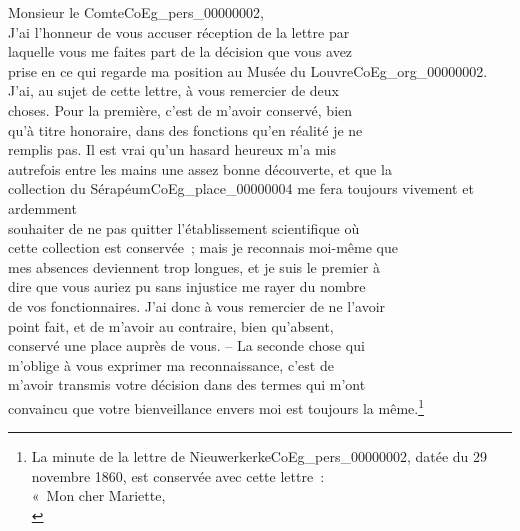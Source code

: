 \documentclass{book}
\begin{document}
{\hspace{1cm} Monsieur le Comte\gls{CoEg_pers_00000002},\\

\indent J’ai l’honneur de vous accuser réception de la lettre par\\
laquelle vous me faites part de la décision que vous avez\\
prise en ce qui regarde ma position au Musée du Louvre\gls{CoEg_org_00000002}.\\
\indent J’ai, au sujet de cette lettre, à vous remercier de deux\\
choses. Pour la première, c’est de m’avoir conservé, bien\\
qu’à titre honoraire, dans des fonctions qu’en réalité je ne\\
remplis pas. Il est vrai qu’un hasard heureux m’a mis\\
autrefois entre les mains une assez bonne découverte, et que la\\
collection du Sérapéum\gls{CoEg_place_00000004} me fera toujours vivement et ardemment\\
souhaiter de ne pas quitter l’établissement scientifique où\\
cette collection est conservée~; mais je reconnais moi-même que\\
mes absences deviennent trop longues, et je suis le premier à\\
dire que vous auriez pu sans injustice me rayer du nombre\\
de vos fonctionnaires. J’ai donc à vous remercier de ne l’avoir\\
point fait, et de m’avoir au contraire, bien qu’absent,\\
conservé une place auprès de vous. – La seconde chose qui\\
m’oblige à vous exprimer ma reconnaissance, c’est de\\
m’avoir transmis votre décision dans des termes qui m’ont\\
convaincu que votre bienveillance envers moi est toujours la même.\footnote{La minute de la lettre de Nieuwerkerke\gls{CoEg_pers_00000002}, datée du 29 novembre 1860, est conservée avec cette lettre~:\\
\indent «~Mon cher Mariette,\\
}}
\end{document}
